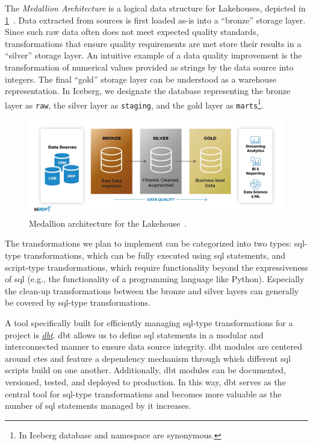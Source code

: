 The \textit{Medallion Architecture} is a logical data structure for Lakehouses, depicted in \cref{fig:design-decisions-elt-medallion}~\cite{Emilio}.
Data extracted from sources is first loaded as-is into a ``bronze'' storage layer.
Since such raw data often does not meet expected quality standards, transformations that ensure quality requirements are met store their results in a ``silver'' storage layer.
An intuitive example of a data quality improvement is the transformation of numerical values provided as strings by the data source into integers.
The final ``gold'' storage layer can be understood as a warehouse representation.
In Iceberg, we designate the database representing the bronze layer as \texttt{raw}, the silver layer as \texttt{staging}, and the gold layer as \texttt{marts}\footnote{In Iceberg database and namespace are synonymous.}.

\begin{figure}[H]
    \centering
    \includegraphics[width=\textwidth]{figures/medallion.png}
    \caption{Medallion architecture for the Lakehouse~\cite{Emilio}.}
    \label{fig:design-decisions-elt-medallion}
\end{figure}

The transformations we plan to implement can be categorized into two types: \ac{sql}-type transformations, which can be fully executed using \ac{sql} statements, and script-type transformations, which require functionality beyond the expressiveness of \ac{sql} (e.g., the functionality of a programming language like Python).
Especially the clean-up transformations between the bronze and silver layers can generally be covered by \ac{sql}-type transformations.

A tool specifically built for efficiently managing \ac{sql}-type transformations for a project is \href{https://www.getdbt.com/}{\textit{dbt}}.
dbt allows us to define \ac{sql} statements in a modular and interconnected manner to ensure data source integrity.
dbt modules are centered around \acp{cte} and feature a dependency mechanism through which different \ac{sql} scripts build on one another.
Additionally, dbt modules can be documented, versioned, tested, and deployed to production.
In this way, dbt serves as the central tool for \ac{sql}-type transformations and becomes more valuable as the number of \ac{sql} statements managed by it increases.


